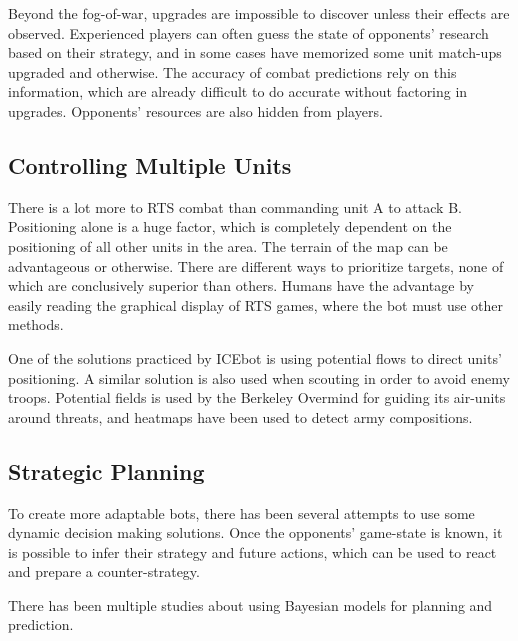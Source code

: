 	Beyond the fog-of-war, upgrades are impossible to discover unless their effects are observed. Experienced players can often guess the state of opponents' research based on their strategy, and in some cases have memorized some unit match-ups upgraded and otherwise. The accuracy of combat predictions rely on this information, which are already difficult to do accurate without factoring in upgrades. Opponents' resources are also hidden from players.
	
	
	\subsection*{Controlling Multiple Units}
	There is a lot more to RTS combat than commanding unit A to attack B. Positioning alone is a huge factor, which is completely dependent on the positioning of all other units in the area. The terrain of the map can be advantageous or otherwise. There are different ways to prioritize targets, none of which are conclusively superior than others. Humans have the advantage by easily reading the graphical display of RTS games, where the bot must use other methods.
	
	One of the solutions practiced by ICEbot is using potential flows to direct units' positioning. A similar solution is also used when scouting in order to avoid enemy troops. Potential fields is used by the Berkeley Overmind for guiding its air-units around threats, and heatmaps have been used to detect army compositions. \cite{Overmind} \cite{Potential12} \cite{PotentialNav}

	\subsection*{Strategic Planning}
	To create more adaptable bots, there has been several attempts to use some dynamic decision making solutions. Once the opponents' game-state is known, it is possible to infer their strategy and future actions, which can be used to react and prepare a counter-strategy.
	
	There has been multiple studies about using Bayesian models for planning and prediction. \cite{BayTac}
	
